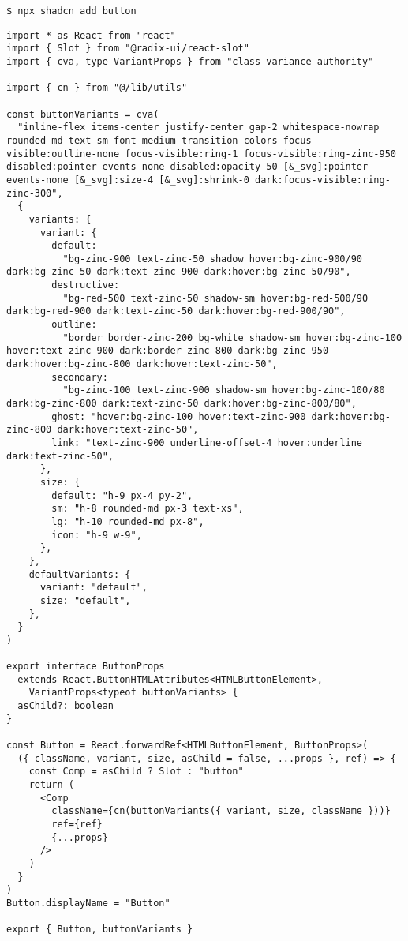 \begin{verbatim}
$ npx shadcn add button
\end{verbatim}

\begin{verbatim}
import * as React from "react"
import { Slot } from "@radix-ui/react-slot"
import { cva, type VariantProps } from "class-variance-authority"

import { cn } from "@/lib/utils"

const buttonVariants = cva(
  "inline-flex items-center justify-center gap-2 whitespace-nowrap rounded-md text-sm font-medium transition-colors focus-visible:outline-none focus-visible:ring-1 focus-visible:ring-zinc-950 disabled:pointer-events-none disabled:opacity-50 [&_svg]:pointer-events-none [&_svg]:size-4 [&_svg]:shrink-0 dark:focus-visible:ring-zinc-300",
  {
    variants: {
      variant: {
        default:
          "bg-zinc-900 text-zinc-50 shadow hover:bg-zinc-900/90 dark:bg-zinc-50 dark:text-zinc-900 dark:hover:bg-zinc-50/90",
        destructive:
          "bg-red-500 text-zinc-50 shadow-sm hover:bg-red-500/90 dark:bg-red-900 dark:text-zinc-50 dark:hover:bg-red-900/90",
        outline:
          "border border-zinc-200 bg-white shadow-sm hover:bg-zinc-100 hover:text-zinc-900 dark:border-zinc-800 dark:bg-zinc-950 dark:hover:bg-zinc-800 dark:hover:text-zinc-50",
        secondary:
          "bg-zinc-100 text-zinc-900 shadow-sm hover:bg-zinc-100/80 dark:bg-zinc-800 dark:text-zinc-50 dark:hover:bg-zinc-800/80",
        ghost: "hover:bg-zinc-100 hover:text-zinc-900 dark:hover:bg-zinc-800 dark:hover:text-zinc-50",
        link: "text-zinc-900 underline-offset-4 hover:underline dark:text-zinc-50",
      },
      size: {
        default: "h-9 px-4 py-2",
        sm: "h-8 rounded-md px-3 text-xs",
        lg: "h-10 rounded-md px-8",
        icon: "h-9 w-9",
      },
    },
    defaultVariants: {
      variant: "default",
      size: "default",
    },
  }
)

export interface ButtonProps
  extends React.ButtonHTMLAttributes<HTMLButtonElement>,
    VariantProps<typeof buttonVariants> {
  asChild?: boolean
}

const Button = React.forwardRef<HTMLButtonElement, ButtonProps>(
  ({ className, variant, size, asChild = false, ...props }, ref) => {
    const Comp = asChild ? Slot : "button"
    return (
      <Comp
        className={cn(buttonVariants({ variant, size, className }))}
        ref={ref}
        {...props}
      />
    )
  }
)
Button.displayName = "Button"

export { Button, buttonVariants }
\end{verbatim}
